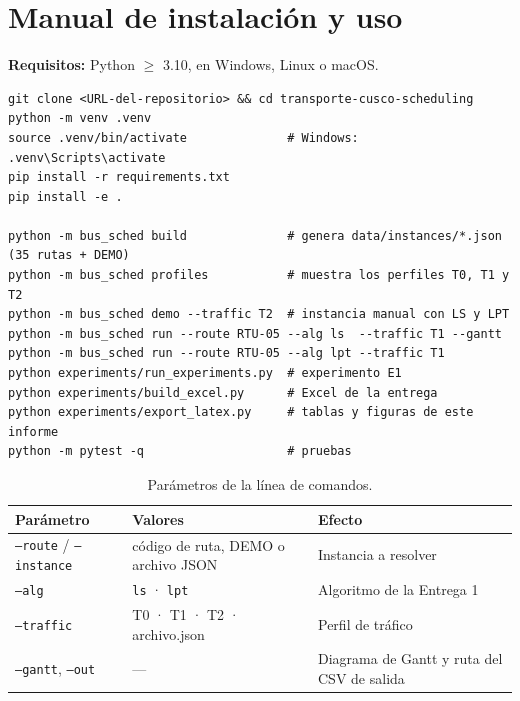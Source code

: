 \section{Manual de instalación y uso}\label{anx:manual}
\textbf{Requisitos:} Python $\ge$ 3.10, en Windows, Linux o macOS.
\begin{lstlisting}
git clone <URL-del-repositorio> && cd transporte-cusco-scheduling
python -m venv .venv
source .venv/bin/activate              # Windows: .venv\Scripts\activate
pip install -r requirements.txt
pip install -e .

python -m bus_sched build              # genera data/instances/*.json (35 rutas + DEMO)
python -m bus_sched profiles           # muestra los perfiles T0, T1 y T2
python -m bus_sched demo --traffic T2  # instancia manual con LS y LPT
python -m bus_sched run --route RTU-05 --alg ls  --traffic T1 --gantt
python -m bus_sched run --route RTU-05 --alg lpt --traffic T1
python experiments/run_experiments.py  # experimento E1
python experiments/build_excel.py      # Excel de la entrega
python experiments/export_latex.py     # tablas y figuras de este informe
python -m pytest -q                    # pruebas
\end{lstlisting}

\begin{table}[H]
\centering\small
\caption{Parámetros de la línea de comandos.}
\begin{tabularx}{\textwidth}{L{4.2cm}L{5.2cm}Y}
\toprule
Parámetro & Valores & Efecto \\
\midrule
\texttt{--route} / \texttt{--instance} & código de ruta, DEMO o archivo JSON & Instancia a resolver \\
\texttt{--alg} & \texttt{ls} · \texttt{lpt} & Algoritmo de la Entrega 1 \\
\texttt{--traffic} & T0 · T1 · T2 · archivo.json & Perfil de tráfico \\
\texttt{--gantt}, \texttt{--out} & --- & Diagrama de Gantt y ruta del CSV de salida \\
\bottomrule
\end{tabularx}
\end{table}

